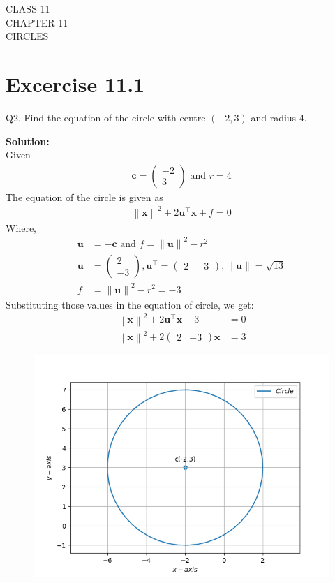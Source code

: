 \documentclass[12pt]{article}
\providecommand{\norm}[1]{\left\lVert#1\right\rVert}
\newcommand{\solution}{\noindent \textbf{Solution: }}
\newcommand{\myvec}[1]{\ensuremath{\begin{pmatrix}#1\end{pmatrix}}}
\let\vec\mathbf
\begin{document}
\begin{center}
\textbf\large{CLASS-11\\CHAPTER-11 \\ CIRCLES}

\end{center}
\section*{Excercise 11.1}

Q2. Find the equation of the circle with centre $(-2,3)$ and radius 4.

\solution
\\
Given
\begin{align}
	\vec{c} = \myvec{-2\\3} \text{ and } r = 4
\end{align}
The equation of the circle is given as
\begin{align}
	\norm{\vec{x}}^{2} + 2\vec{u}^{\top}\vec{x} + f = 0
\end{align}
Where,
\begin{align}
	\vec{u} &= -\vec{c} \text{ and } f = \norm{\vec{u}}^{2} - r^{2}\\
	\vec{u} &= \myvec{2\\-3},\vec{u}^\top=\myvec{2&-3},\norm{\vec{u}} = \sqrt{13}\\
	f &= \norm{\vec{u}}^2 - r^2= -3
\end{align}
Substituting those values in the equation of circle, we get:
\begin{align}
	\norm{\vec{x}}^2 + 2\vec{u}^\top\vec{x}-3 &= 0\\
	\norm{\vec{x}}^2 + 2\myvec{2&-3}\vec{x} &= 3    		       
\end{align}	
\begin{figure}[!h]
	\begin{center} 
	    \includegraphics[width=\columnwidth]{figs/circle.png}
	\end{center}
\caption{}
\label{fig:Fig1}
\end{figure}
\end{document}
